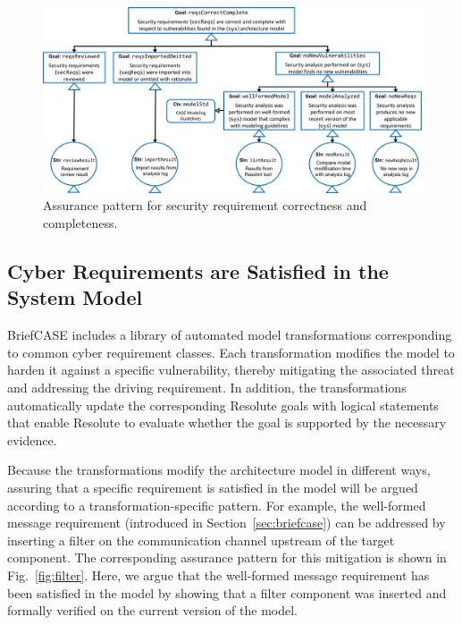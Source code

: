\begin{figure}[h] 
	\centering 
	\includegraphics[width=\textwidth]{figs/req-correct-complete.png}
	\caption{Assurance pattern for security requirement correctness and completeness.}
	\label{fig:req-correct-complete} 
\end{figure}

\subsection{Cyber Requirements are Satisfied in the System Model}
\label{sec:requirements-satisfied-in-model}
BriefCASE includes a library of automated model transformations corresponding to common cyber requirement classes.  Each transformation modifies the model to harden it against a specific vulnerability, thereby mitigating the associated threat and addressing the driving requirement.  In addition, the transformations automatically update the corresponding Resolute goals with logical statements that enable Resolute to evaluate whether the goal is supported by the necessary evidence.

Because the transformations modify the architecture model in different ways, assuring that a specific requirement is satisfied in the model will be argued according to a transformation-specific pattern.  For example, the well-formed message requirement (introduced in Section~\ref{sec:briefcase}) can be addressed by inserting a filter on the communication channel upstream of the target component.  The corresponding assurance pattern for this mitigation is shown in Fig.~\ref{fig:filter}.  
Here, we argue that the well-formed message requirement has been satisfied in the model by showing that a filter component was inserted and formally verified on the current version of the model.  


